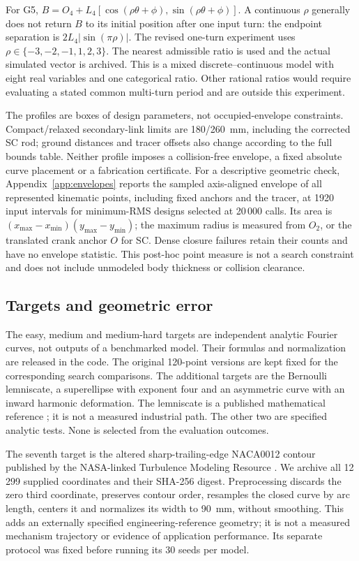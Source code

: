 \documentclass[applsci,article,submit,pdftex,moreauthors]{Definitions/mdpi}
\begin{document}
For G5, $B=O_4+L_4[\cos(\rho\theta+\phi),\sin(\rho\theta+\phi)]$. A continuous $\rho$ generally does not return $B$ to its initial position after one input turn: the endpoint separation is $2L_4|\sin(\pi\rho)|$. The revised one-turn experiment uses $\rho\in\{-3,-2,-1,1,2,3\}$. The nearest admissible ratio is used and the actual simulated vector is archived. This is a mixed discrete--continuous model with eight real variables and one categorical ratio. Other rational ratios would require evaluating a stated common multi-turn period and are outside this experiment.

The profiles are boxes of design parameters, not occupied-envelope constraints. Compact/relaxed secondary-link limits are 180/260~mm, including the corrected SC rod; ground distances and tracer offsets also change according to the full bounds table. Neither profile imposes a collision-free envelope, a fixed absolute curve placement or a fabrication certificate.
For a descriptive geometric check, Appendix~\ref{app:envelopes} reports the sampled axis-aligned envelope of all represented kinematic points, including fixed anchors and the tracer, at 1920 input intervals for minimum-RMS designs selected at 20\,000 calls. Its area is $(x_{\max}-x_{\min})(y_{\max}-y_{\min})$; the maximum radius is measured from $O_2$, or the translated crank anchor $O$ for SC. Dense closure failures retain their counts and have no envelope statistic. This post-hoc point measure is not a search constraint and does not include unmodeled body thickness or collision clearance.

\subsection{Targets and geometric error}\label{sec:targets}
The easy, medium and medium-hard targets are independent analytic Fourier curves, not outputs of a benchmarked model. Their formulas and normalization are released in the code. The original 120-point versions are kept fixed for the corresponding search comparisons. The additional targets are the Bernoulli lemniscate, a superellipse with exponent four and an asymmetric curve with an inward harmonic deformation. The lemniscate is a published mathematical reference \cite{BernoulliReference}; it is not a measured industrial path. The other two are specified analytic tests. None is selected from the evaluation outcomes.

The seventh target is the altered sharp-trailing-edge NACA0012 contour published by the NASA-linked Turbulence Modeling Resource \cite{NASATMR}. We archive all 12\,299 supplied coordinates and their SHA-256 digest. Preprocessing discards the zero third coordinate, preserves contour order, resamples the closed curve by arc length, centers it and normalizes its width to 90~mm, without smoothing. This adds an externally specified engineering-reference geometry; it is not a measured mechanism trajectory or evidence of application performance. Its separate protocol was fixed before running its 30 seeds per model.
\end{document}
